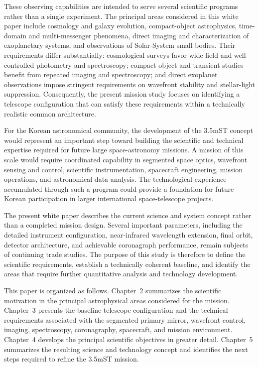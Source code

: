 These observing capabilities are intended to serve several scientific
programs rather than a single experiment. The principal areas considered
in this white paper include cosmology and galaxy evolution, compact-object
astrophysics, time-domain and multi-messenger phenomena, direct imaging
and characterization of exoplanetary systems, and observations of
Solar-System small bodies. Their requirements differ substantially:
cosmological surveys favor wide field and well-controlled photometry and
spectroscopy; compact-object and transient studies benefit from repeated
imaging and spectroscopy; and direct exoplanet observations impose stringent
requirements on wavefront stability and stellar-light suppression.
Consequently, the present mission study focuses on identifying a telescope
configuration that can satisfy these requirements within a technically
realistic common architecture.

For the Korean astronomical community, the development of the 3.5mST concept
would represent an important step toward building the scientific and
technical expertise required for future large space-astronomy missions.
A mission of this scale would require coordinated capability
in segmented space optics, wavefront sensing and control, scientific
instrumentation, spacecraft engineering, mission operations, and
astronomical data analysis. The technological experience accumulated
through such a program could provide a foundation for future Korean
participation in larger international space-telescope projects.

The present white paper describes the current science and system concept
rather than a completed mission design. Several important parameters,
including the detailed instrument configuration, near-infrared wavelength
extension, final orbit, detector architecture, and achievable coronagraph
performance, remain subjects of continuing trade studies. The purpose of
this study is therefore to define the scientific requirements, establish
a technically coherent baseline, and identify the areas that require
further quantitative analysis and technology development.

This paper is organized as follows. Chapter~2 summarizes the scientific
motivation in the principal astrophysical areas considered for the mission.
Chapter~3 presents the baseline telescope configuration and the technical
requirements associated with the segmented primary mirror, wavefront
control, imaging, spectroscopy, coronagraphy, spacecraft, and mission
environment. Chapter~4 develops the principal scientific objectives in
greater detail. Chapter~5 summarizes the resulting science and technology
concept and identifies the next steps required to refine the 3.5mST
mission.

